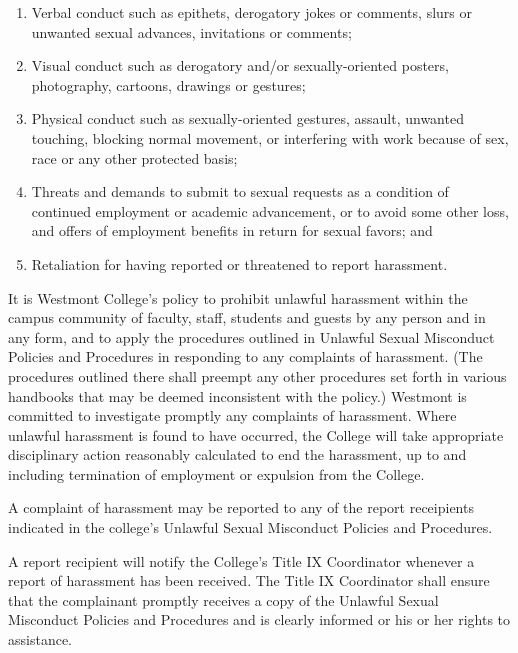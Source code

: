 			\begin{enumerate}[label=\alph*)]

				\item{ Verbal conduct such as epithets, derogatory jokes or
					comments, slurs or unwanted sexual advances, invitations or
					comments; }

				\item{ Visual conduct such as derogatory and/or sexually-oriented
					posters, photography, cartoons, drawings or gestures; }

				\item{ Physical conduct such as sexually-oriented gestures, assault,
					unwanted touching, blocking normal movement, or interfering with
					work because of sex, race or any other protected basis; }

				\item{ Threats and demands to submit to sexual requests as a
					condition of continued employment or academic advancement, or to
					avoid some other loss, and offers of employment benefits in return
					for sexual favors; and }

				\item{ Retaliation for having reported or threatened to report
					harassment. }
			\end{enumerate}

			\quad It is Westmont College's policy to prohibit unlawful
			harassment within the campus community of faculty, staff, students
			and guests by any person and in any form, and to apply the
			procedures outlined in Unlawful Sexual Misconduct Policies and Procedures
			in responding to any complaints of
			harassment.  (The procedures outlined there shall preempt any other
			procedures set forth in various handbooks that may be deemed
			inconsistent with the policy.)  Westmont is committed to investigate
			promptly any complaints of harassment.  Where unlawful harassment is
			found to have occurred, the College will take appropriate
			disciplinary action reasonably calculated to end the harassment, up
			to and including termination of employment or expulsion from the
			College.

			\quad A complaint of harassment may be reported to any of the
			report receipients indicated in the college's Unlawful Sexual
			Misconduct Policies and Procedures.

			\quad A report recipient will notify the College's Title IX Coordinator
			whenever a report of harassment has been received.  The Title IX
			Coordinator shall ensure that the complainant promptly receives
			a copy of the Unlawful Sexual Misconduct Policies and Procedures and
			is clearly informed or his or her rights to assistance.


